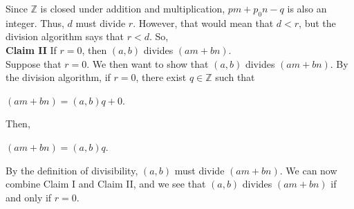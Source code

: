 \documentclass[12pt]{article}
\newcommand{\Z}{\mathbb{Z}}
\newenvironment{problem}[2][Problem]{\begin{trivlist}
\item[\hskip \labelsep {\bfseries #1}\hskip \labelsep {\bfseries #2.}]}{\end{trivlist}}
\begin{document}
\begin{problem}{3}
\noindent
Since $\Z$ is closed under addition and multiplication, $pm+p_0n-q$ is also an integer. Thus, $d$ must divide $r$. However, that would mean that $d<r$, but the division algorithm says that $r<d$. So, \\

\noindent
\textbf{Claim II} If $r=0$, then $(a,b)$ divides $(am+bn)$. \\

\noindent
Suppose that $r=0$. We then want to show that $(a,b)$ divides $(am+bn)$. By the division algorithm, if $r=0$, there exist $q \in \Z$ such that 

\begin{center}
$(am+bn)=(a,b)q+0$.
\end{center}

\noindent
Then,

\begin{center}
$(am+bn)=(a,b)q$. \\
\end{center}

\noindent
By the definition of divisibility, $(a,b)$ must divide $(am+bn)$. We can now combine Claim I and Claim II, and we see that $(a,b)$ divides $(am+bn)$ if and only if $r=0$. \qedsymbol
\end{problem}

\end{document}
